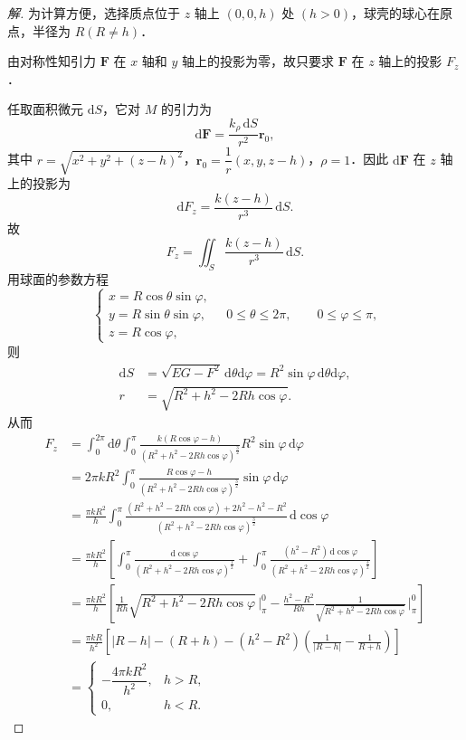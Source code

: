 \begin{proof}[解]
为计算方便，选择质点位于 $z$ 轴上 $(0,0,h)$ 处 $(h>0)$，球壳的球心在原点，半径为 $R(R\neq h)$．

由对称性知引力 $\bm{F}$ 在 $x$ 轴和 $y$ 轴上的投影为零，故只要求 $\bm{F}$ 在 $z$ 轴上的投影 $F_{z}$．

任取面积微元 $\mathrm{d}S$，它对 $M$ 的引力为
\[
\mathrm{d}\bm{F}=\frac{k_{\rho}\,\mathrm{d}S}{r^{2}}\bm{r}_{0},
\]
其中 $r=\sqrt{x^{2}+y^{2}+(z-h)^{2}}$，$\bm{r}_{0}=\dfrac{1}{r}(x,y,z-h)$，$\rho=1$．因此 $\mathrm{d}\bm{F}$ 在 $z$ 轴上的投影为
\[
\mathrm{d}F_{z}=\frac{k(z-h)}{r^{3}}\,\mathrm{d}S.
\]
故
\[
F_{z}=\iint_{S}\frac{k(z-h)}{r^{3}}\,\mathrm{d}S.
\]
用球面的参数方程
\[
\begin{cases}
x=R\cos\theta\sin\varphi,\\
y=R\sin\theta\sin\varphi,\\
z=R\cos\varphi,
\end{cases}
\quad 0\leqslant\theta\leqslant2\pi,\qquad 0\leqslant\varphi\leqslant\pi,
\]
则
\[
\begin{aligned}
\mathrm{d}S&=\sqrt{EG-F^{2}}\,\mathrm{d}\theta\mathrm{d}\varphi=R^{2}\sin\varphi\,\mathrm{d}\theta\mathrm{d}\varphi,\\
r&=\sqrt{R^{2}+h^{2}-2Rh\cos\varphi}.
\end{aligned}
\]
从而
\[
\begin{aligned}
F_{z}&=\int_{0}^{2\pi}\mathrm{d}\theta\int_{0}^{\pi}\frac{k(R\cos\varphi-h)}{(R^{2}+h^{2}-2Rh\cos\varphi)^{\frac{3}{2}}}R^{2}\sin\varphi\,\mathrm{d}\varphi\\
&=2\pi kR^{2}\int_{0}^{\pi}\frac{R\cos\varphi-h}{(R^{2}+h^{2}-2Rh\cos\varphi)^{\frac{3}{2}}}\sin\varphi\,\mathrm{d}\varphi\\
&=\frac{\pi kR^{2}}{h}\int_{0}^{\pi}\frac{(R^{2}+h^{2}-2Rh\cos\varphi)+2h^{2}-h^{2}-R^{2}}{(R^{2}+h^{2}-2Rh\cos\varphi)^{\frac{3}{2}}}\,\mathrm{d}\cos\varphi\\
&=\frac{\pi kR^{2}}{h}\left[\int_{0}^{\pi}\frac{\mathrm{d}\cos\varphi}{(R^{2}+h^{2}-2Rh\cos\varphi)^{\frac{1}{2}}}+\int_{0}^{\pi}\frac{(h^{2}-R^{2})\,\mathrm{d}\cos\varphi}{(R^{2}+h^{2}-2Rh\cos\varphi)^{\frac{3}{2}}}\right]\\
&=\frac{\pi kR^{2}}{h}\left[\frac{1}{Rh}\sqrt{R^{2}+h^{2}-2Rh\cos\varphi}\,\Bigg|_{\pi}^{0}-\frac{h^{2}-R^{2}}{Rh}\frac{1}{\sqrt{R^{2}+h^{2}-2Rh\cos\varphi}}\,\Bigg|_{\pi}^{0}\right]\\
&=\frac{\pi kR}{h^{2}}\left[|R-h|-(R+h)-(h^{2}-R^{2})\left(\frac{1}{|R-h|}-\frac{1}{R+h}\right)\right]\\
&=\begin{cases}
-\dfrac{4\pi kR^{2}}{h^{2}},&h>R,\\[4pt]
0,&h<R.
\end{cases}
\end{aligned}
\]
\end{proof}

